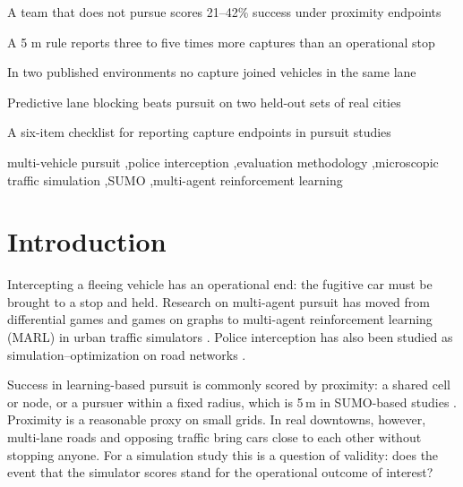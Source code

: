 \documentclass[5p,twocolumn]{elsarticle}
\begin{document}
\begin{frontmatter}
\begin{highlights}
\item A team that does not pursue scores 21--42\% success under proximity endpoints
\item A 5 m rule reports three to five times more captures than an operational stop
\item In two published environments no capture joined vehicles in the same lane
\item Predictive lane blocking beats pursuit on two held-out sets of real cities
\item A six-item checklist for reporting capture endpoints in pursuit studies
\end{highlights}

\begin{keyword}
multi-vehicle pursuit \sep police interception \sep evaluation methodology \sep microscopic traffic simulation \sep SUMO \sep multi-agent reinforcement learning
\end{keyword}

\end{frontmatter}

\section{Introduction}
\label{sec:introduction}

Intercepting a fleeing vehicle has an operational end: the fugitive car must be brought to a stop and held. Research
on multi-agent pursuit has moved from differential games \cite{isaacs1965,chung2011} and games on graphs
\cite{aigner1984,parsons1978,fomin2010,crytser2020} to multi-agent reinforcement learning (MARL) in urban traffic
simulators \cite{yuan2022t3omvp,li2024pepcrl,yang2022gradedq,li2023dgmarl,wang2022opponent}. Police interception has
also been studied as simulation--optimization on road networks
\cite{vandroffelaar2024simopt,vandroffelaar2025graph,vandroffelaar2025behavior}.

Success in learning-based pursuit is commonly scored by proximity: a shared cell or node, or a pursuer within a fixed
radius, which is 5\,m in SUMO-based studies \cite{li2024pepcrl,li2023dgmarl}. Proximity is a reasonable proxy on small
grids. In real downtowns, however, multi-lane roads and opposing traffic bring cars close to each other without
stopping anyone. For a simulation study this is a question of validity: does the event that the simulator scores
stand for the operational outcome of interest?
\end{document}
